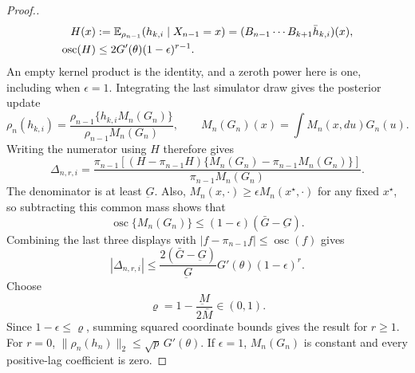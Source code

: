 \documentclass[11pt]{article}
\theoremstyle{thmstylethree}%
\begin{document}
{\begin{proof}[Proof.]
\begin{align}
H(x)&:=\mathbb{E}_{\rho_{n-1}}(h_{k,i}\mid X_{n-1}=x)
=(B_{n-1}\cdots B_{k+1}\bar h_{k,i})(x),
\label{eq:iterated-backward-conditioning}\\
\operatorname{osc}(H)&\leq2G'(\theta)(1-\epsilon)^{r-1}.
\label{eq:conditional-past-score-forgetting}
\end{align}
An empty kernel product is the identity, and a zeroth power here is one,
including when $\epsilon=1$.
\endgraf
Integrating the last simulator draw gives the posterior update
\begin{equation}
\rho_n(h_{k,i})=
\frac{\rho_{n-1}\{h_{k,i}M_n(G_n)\}}{\rho_{n-1}M_n(G_n)},
\qquad M_n(G_n)(x)=\int M_n(x,du)G_n(u).
\label{eq:posterior-path-update-functional}
\end{equation}
Writing the numerator using $H$ therefore gives
\begin{equation}
\Delta_{n,r,i}=
\frac{\pi_{n-1}[(H-\pi_{n-1}H)
\{M_n(G_n)-\pi_{n-1}M_n(G_n)\}]}{\pi_{n-1}M_n(G_n)}.
\label{eq:lag-coefficient-covariance-identity}
\end{equation}
The denominator is at least $\underbar G$. Also,
$M_n(x,\cdot)\geq\epsilon M_n(x^\star,\cdot)$ for any fixed
$x^\star$, so subtracting this common mass shows that
\begin{equation}
\operatorname{osc}\{M_n(G_n)\}
\leq(1-\epsilon)(\bar G-\underbar G).
\label{eq:predictive-potential-oscillation}
\end{equation}
Combining the last three displays with
$|f-\pi_{n-1}f|\leq\operatorname{osc}(f)$ gives
\begin{equation}
|\Delta_{n,r,i}|\leq
\frac{2(\bar G-\underbar G)}{\underbar G}
G'(\theta)(1-\epsilon)^r.
\label{eq:lag-coordinate-geometric-bound}
\end{equation}
Choose
\begin{equation}
\varrho=1-\frac{\underbar M}{2\bar M}\in(0,1).
\label{eq:population-forgetting-varrho}
\end{equation}
Since $1-\epsilon\leq\varrho$, summing squared coordinate bounds gives
the result for $r\geq1$. For $r=0$,
$\|\rho_n(h_n)\|_2\leq\sqrt p\,G'(\theta)$.
If $\epsilon=1$, $M_n(G_n)$ is constant and every positive-lag
coefficient is zero.
\end{proof}
\endgraf
\endgraf
}
\end{document}
